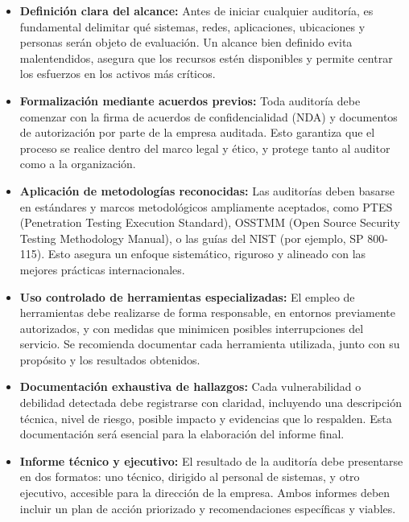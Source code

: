 \documentclass[a4paper, 11pt]{article}
\begin{document}
\begin{itemize}

    \item \textbf{Definición clara del alcance:}  
    Antes de iniciar cualquier auditoría, es fundamental delimitar qué sistemas, redes, aplicaciones, ubicaciones y personas serán objeto de evaluación. Un alcance bien definido evita malentendidos, asegura que los recursos estén disponibles y permite centrar los esfuerzos en los activos más críticos.

    \item \textbf{Formalización mediante acuerdos previos:}  
    Toda auditoría debe comenzar con la firma de acuerdos de confidencialidad (NDA) y documentos de autorización por parte de la empresa auditada. Esto garantiza que el proceso se realice dentro del marco legal y ético, y protege tanto al auditor como a la organización.

    \item \textbf{Aplicación de metodologías reconocidas:}  
    Las auditorías deben basarse en estándares y marcos metodológicos ampliamente aceptados, como PTES (Penetration Testing Execution Standard), OSSTMM (Open Source Security Testing Methodology Manual), o las guías del NIST (por ejemplo, SP 800-115). Esto asegura un enfoque sistemático, riguroso y alineado con las mejores prácticas internacionales.

    \item \textbf{Uso controlado de herramientas especializadas:}  
    El empleo de herramientas debe realizarse de forma responsable, en entornos previamente autorizados, y con medidas que minimicen posibles interrupciones del servicio. Se recomienda documentar cada herramienta utilizada, junto con su propósito y los resultados obtenidos.

    \item \textbf{Documentación exhaustiva de hallazgos:}  
    Cada vulnerabilidad o debilidad detectada debe registrarse con claridad, incluyendo una descripción técnica, nivel de riesgo, posible impacto y evidencias que lo respalden. Esta documentación será esencial para la elaboración del informe final.

    \item \textbf{Informe técnico y ejecutivo:}  
    El resultado de la auditoría debe presentarse en dos formatos: uno técnico, dirigido al personal de sistemas, y otro ejecutivo, accesible para la dirección de la empresa. Ambos informes deben incluir un plan de acción priorizado y recomendaciones específicas y viables.


\end{itemize}
\end{document}

